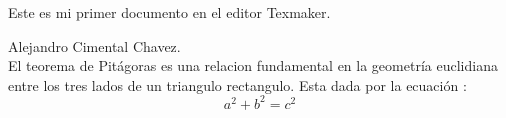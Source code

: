 \documentclass[11pt]{article}
\begin{document}
Este es mi primer documento en el editor Texmaker.

Alejandro Cimental Chavez.\\

El teorema de Pitágoras es una relacion fundamental en la geometría euclidiana entre los tres lados de un triangulo rectangulo. Esta dada por la ecuación :
$$a^2+b^2=c^2$$
\end{document}
